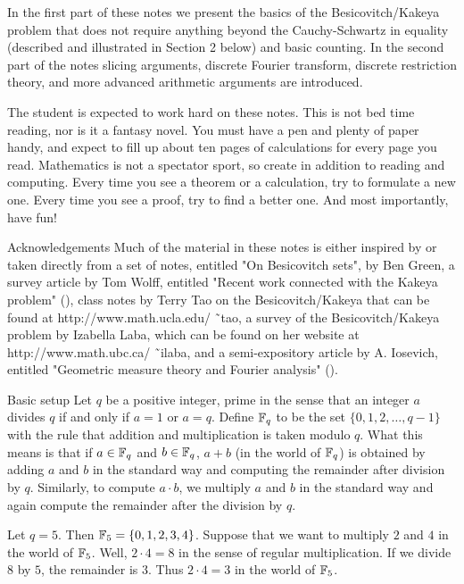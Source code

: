 In the first part of these notes we present the basics of the
Besicovitch/Kakeya problem that does not require anything beyond the
Cauchy-Schwartz in equality (described and illustrated in Section 2
below) and basic counting. In the second part of the notes slicing
arguments, discrete Fourier transform, discrete restriction theory, and
more advanced arithmetic arguments are introduced.

The student is expected to work hard on these notes. This is not bed time
reading, nor is it a fantasy novel. You must have a pen and plenty of
paper handy, and expect to fill up about ten pages of calculations for
every page you read. Mathematics is not a spectator sport, so create in
addition to reading and computing. Every time you see a theorem or a
calculation, try to formulate a new one. Every time you see a proof, try
to find a better one. And most importantly, have fun!

\subhead Acknowledgements \endsubhead Much of the material in these notes
is either inspired by or taken directly from a set of notes, entitled "On
Besicovitch sets", by Ben Green, a survey article by Tom Wolff,
entitled "Recent work connected with the Kakeya problem" (\cite{W99}),
class notes by Terry Tao on the Besicovitch/Kakeya that can be found at
http://www.math.ucla.edu/
\~ \ tao, a survey of the Besicovitch/Kakeya problem by Izabella Laba,
which can be found on her website at http://www.math.ubc.ca/ \~ \ ilaba,
and a semi-expository article by A. Iosevich, entitled "Geometric measure
theory and Fourier analysis" (\cite{I04}). 

\head Basic setup \endhead Let $q$ be a positive integer, prime in
the sense that an integer $a$ divides $q$ if and only if $a=1$ or
$a=q$. Define ${\Bbb F}_q$ to be the set $\{0,1,2, \dots, q-1\}$ with the
rule that addition and multiplication is taken modulo $q$. What this
means is that if $a \in {\Bbb F}_q$ and $b \in {\Bbb F}_q$, $a+b$ (in the
world of ${\Bbb F}_q$) is obtained by adding $a$ and $b$ in the standard
way and computing the remainder after division by $q$. Similarly, to
compute $a \cdot b$, we multiply $a$ and $b$ in the standard way and
again compute the remainder after the division by $q$.

 Let $q=5$. Then ${\Bbb F}_5=\{0,1,2,3,4\}$. Suppose
that we want to multiply $2$ and $4$ in the world of ${\Bbb F}_5$. Well,
$2 \cdot 4=8$ in the sense of regular multiplication. If we divide $8$ by
$5$, the remainder is $3$. Thus $2 \cdot 4=3$ in the world of ${\Bbb
F}_5$.

